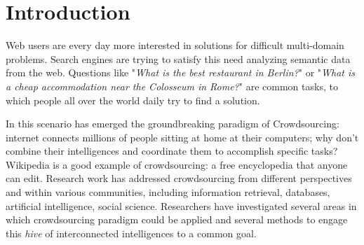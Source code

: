 
\cleardoublepage
{}

\chapter*{Introduction}

Web users are every day more interested in solutions for difficult multi-domain
problems. Search engines are trying to satisfy this need analyzing semantic
data from the web. Questions like "\emph{What is the best restaurant in
Berlin?}" or "\emph{What is a cheap accommodation near the Colosseum in Rome?}" are common tasks,
to which people all over the world daily try to find a solution.


In this scenario has emerged the groundbreaking paradigm of Crowdsourcing:
internet connects millions of people sitting at home at their computers;
why don't combine their intelligences and coordinate them to accomplish
specific tasks? Wikipedia is a good example of crowdsourcing: a free
encyclopedia that anyone can edit. Research work has addressed crowdsourcing
from different perspectives and within various communities, including
information retrieval, databases, artificial intelligence, social
science. Researchers have investigated several areas in which crowdsourcing
paradigm could be applied and several methods to engage this \emph{hive}
of interconnected intelligences to a common goal.

